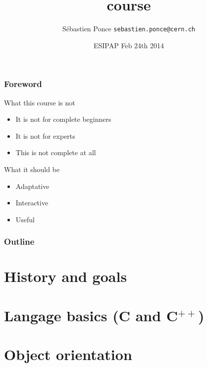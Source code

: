 \documentclass[compress]{beamer}
\title{\cpp course}
\author[S. Ponce]{S\'ebastien Ponce  \texttt{sebastien.ponce@cern.ch}}
\institute{CERN}
\date{ESIPAP Feb 24th 2014}
\newcommand{\cpp}{C$^{++}$}
\begin{document}
\begin{frame}
  \titlepage
\end{frame}

\begin{frame}
  \frametitle{Foreword}
  \begin{block}{What this course is not}
    \begin{itemize}
    \item It is not for complete beginners
    \item It is not for experts
    \item This is not complete at all
    \end{itemize}
  \end{block}
  \begin{block}{What it should be}
    \begin{itemize}
    \item Adaptative
    \item Interactive
    \item Useful
    \end{itemize}
  \end{block}
\end{frame}

\begin{frame}
  \frametitle{Outline}
  \tableofcontents[sectionstyle=show,subsectionstyle=hide]
\end{frame}

\section[Introduction]{History and goals}
%

\section[Basics]{Langage basics (C and \cpp)}
%

\section[OO]{Object orientation}
%



%
\end{document}
